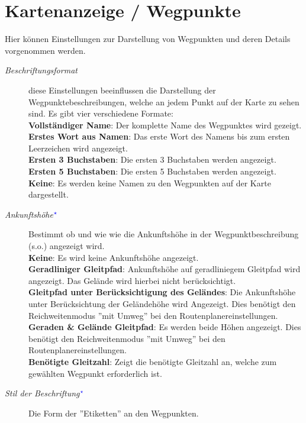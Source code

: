 \section{Kartenanzeige / Wegpunkte}\label{sec:waypoint-display}
Hier können Einstellungen zur Darstellung von Wegpunkten und deren Details
vorgenommen werden.

\begin{description}
\item[\textit{Beschriftungsformat}]  diese Einstellungen beeinflussen die Darstellung der Wegpunktebeschreibungen,
  welche an jedem Punkt auf der Karte zu sehen sind.\label{conf:labels}
  Es gibt vier verschiedene Formate:\\
  {\bf Vollständiger Name}: Der komplette Name des Wegpunktes wird gezeigt. \\
  {\bf Erstes Wort aus Namen}: Das erste Wort des Namens bis zum ersten Leerzeichen wird angezeigt.
    \\
  {\bf Ersten 3 Buchstaben}: Die ersten 3 Buchstaben werden angezeigt. \\
  {\bf Ersten 5 Buchstaben}: Die ersten 5 Buchstaben werden angezeigt. \\
  {\bf Keine}: Es werden keine Namen zu den Wegpunkten auf der Karte dargestellt.
\item[\textit{Ankunftshöhe$^{\textcolor{blue}{\star}}$}] Bestimmt ob und wie wie die Ankunftshöhe  in der Wegpunktbeschreibung (s.o.) angezeigt wird. \\
  {\bf Keine}: Es wird keine Ankunftshöhe angezeigt. \\
  {\bf Geradliniger Gleitpfad}: Ankunftshöhe auf geradliniegem Gleitpfad wird angezeigt. Das Gelände wird hierbei  nicht berücksichtigt. \\
  {\bf Gleitpfad unter Berücksichtigung des Geländes}: Die Ankunftshöhe unter Berücksichtung der Geländehöhe wird Angezeigt.
  \achtung Dies benötigt den Reichweitenmodus ''mit Umweg'' bei den Routenplanereinstellungen. \\
  {\bf Geraden \& Gelände Gleitpfad}: Es werden beide Höhen angezeigt. Dies benötigt den Reichweitenmodus ''mit Umweg'' bei den Routenplanereinstellungen.  \\
  {\bf Benötigte Gleitzahl}: Zeigt die benötigte Gleitzahl an, welche zum gewählten Wegpunkt  erforderlich ist.
\item[\textit{Stil der Beschriftung$^{\textcolor{blue}{\star}}$}]  Die Form der ''Etiketten'' an den Wegpunkten.\\

\end{description}
